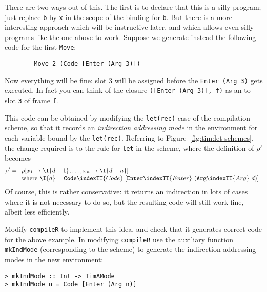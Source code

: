 There are two ways out of this.  The first is to declare that
this is a silly program; just replace \mbox{\tt b} by \mbox{\tt x} in the scope of the
binding for \mbox{\tt b}.
But there is a more interesting approach which will be instructive later,
and which allows even silly programs like the one above to work.
Suppose we generate instead the following code for the first \mbox{\tt Move}:
\begin{verbatim}
        Move 2 (Code [Enter (Arg 3)])
\end{verbatim}
Now everything will be fine: slot 3 will be assigned before the
\mbox{\tt Enter\ (Arg\ 3)} gets executed.
In fact you can think of the closure \mbox{\tt ([Enter\ (Arg\ 3)],\ f)} as
an  to slot \mbox{\tt 3} of frame \mbox{\tt f}.

This code can be obtained by modifying the \mbox{\tt let(rec)} case of
the \tR{} compilation scheme, so that it records an {\em indirection
addressing mode\/} in the environment for each variable
bound by the \mbox{\tt let(rec)}.
Referring to Figure~\ref{fig:tim:let-schemes}, the change required is to
the rule for \mbox{\tt let} in the \tR{} scheme, where the definition of $\rho'$
becomes
\[
\rho' =
\begin{array}[t]{l}
\rho[x_1 \mapsto \I{d+1}, \ldots, x_n \mapsto \I{d+n}] \\
\mbox{where}~ \I{d} = \mbox{\tt Code}\indexTT{Code}~[\mbox{\tt Enter}\indexTT{Enter}~(\mbox{\tt Arg}\indexTT{Arg}~d)]
\end{array}
\]
Of course, this is rather conservative: it returns an indirection in
lots of cases where it is not necessary to do so, but the resulting code
will still work fine, albeit less efficiently.

\begin{exercise}
\label{ex:tim:letrec-bug}
Modify \mbox{\tt compileR} to implement this idea, and
check that it generates correct code for the above example.
In modifying \mbox{\tt compileR} use the auxiliary function \mbox{\tt mkIndMode}
(corresponding to the \tI{} scheme)
to generate the indirection addressing modes in the new environment:
\begin{verbatim}
> mkIndMode :: Int -> TimAMode
> mkIndMode n = Code [Enter (Arg n)]
\end{verbatim}
%
%
\end{exercise}

